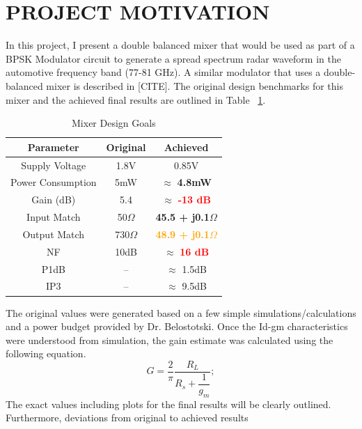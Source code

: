 \documentclass{article}                                                         %
\begin{document}
\section{PROJECT MOTIVATION}
In this project, I present a double balanced mixer that would be used as part of a  BPSK Modulator circuit
to generate a spread spectrum radar waveform in the automotive frequency band (77-81 GHz). A similar modulator
that uses a double-balanced mixer is described in [CITE]. The original design benchmarks for this mixer
and the achieved final results are outlined in Table ~\ref{table:goalsnresults}.\vspace{3mm}
\vspace{3mm}
\begin{table}[H]
\centering
 \begin{tabular}{ | c | c | c |}
   \hline
    \textbf{Parameter} & \textbf{Original} & \textbf{Achieved}  \\
    \hline
    \hline
    Supply Voltage & 1.8V & 0.85V \\
    \hline
    Power Consumption & 5mW & $\approx$ \textbf{\textcolor{OliveGreen}{4.8mW}}\\
    \hline
    Gain (dB)   & 5.4 & $\approx$ \textbf{\textcolor{Red}{-13 dB}} \\
    \hline
    Input Match  & 50$\Omega$ & \textbf{\textcolor{OliveGreen}{45.5 + j0.1$\Omega$}} \\
    \hline
    Output Match & 730$\Omega$ & \textbf{\textcolor{Orange}{48.9 + j0.1$\Omega$}}\\
    \hline
    NF & 10dB & $\approx$ \textbf{\textcolor{Red}{16 dB}}\\
    \hline
    P1dB & -- & $\approx$ 1.5dB  \\
    \hline
    IP3 & -- & $\approx$ 9.5dB  \\
    \hline
  \end{tabular}
  \caption{Mixer Design Goals}
  \label{table:goalsnresults}
\end{table}
The original values were generated based on a few simple simulations/calculations and a power budget provided by Dr. Belostotski. Once the Id-gm
characteristics were understood from simulation, the gain estimate was calculated using the following equation.
\begin{equation}
  \label{eq:idealgain}
  G=\dfrac{2}{\pi}\dfrac{R_L}{R_s + \dfrac{1}{g_m}};
\end{equation}
The exact values including plots for the final results will be clearly outlined. Furthermore, deviations from original to achieved results
\end{document}
